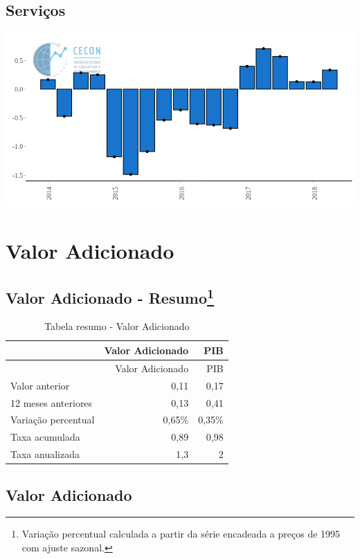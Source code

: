\documentclass[11pt,portuguese,]{article}
\let\rmarkdownfootnote\footnote%
\def\footnote{\protect\rmarkdownfootnote}
\begin{document}
\subsection{Serviços}\label{servicos}

\begin{center}\includegraphics[width=1\linewidth]{Grafico_Servicos} \end{center}

\section{Valor Adicionado}\label{valor-adicionado}

\subsection[Valor Adicionado - Resumo]{\texorpdfstring{Valor Adicionado
- Resumo\footnote{Variação percentual calculada a partir da série
  encadeada a preços de 1995 com ajuste sazonal.}}{Valor Adicionado - Resumo}}\label{valor-adicionado---resumo3}

\begin{longtable}[]{@{}lrr@{}}
\caption{Tabela resumo - Valor Adicionado}\tabularnewline
\toprule
& Valor Adicionado & PIB\tabularnewline
\midrule
\endfirsthead
\toprule
& Valor Adicionado & PIB\tabularnewline
\midrule
\endhead
Valor anterior & 0,11 & 0,17\tabularnewline
12 meses anteriores & 0,13 & 0,41\tabularnewline
Variação percentual & 0,65\% & 0,35\%\tabularnewline
Taxa acumulada & 0,89 & 0,98\tabularnewline
Taxa anualizada & 1,3 & 2\tabularnewline
\bottomrule
\end{longtable}

\subsection{Valor Adicionado}\label{valor-adicionado-1}
\end{document}
